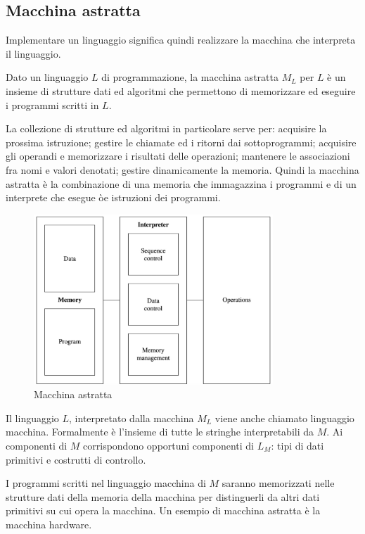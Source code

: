 \documentclass[oneside,a4paper,11pt]{book}
\theoremstyle{italicstyle}
\theoremstyle{normStyle}
\begin{document}
\subsection{Macchina astratta}
Implementare un linguaggio significa quindi realizzare la macchina 
che interpreta il linguaggio.
\begin{tcolorbox}
Dato un linguaggio $L$ di programmazione, la macchina astratta 
$M_L$ per $L$ è un insieme di strutture dati ed algoritmi che permettono 
di memorizzare ed eseguire i programmi scritti in $L$.
\end{tcolorbox}
La collezione di strutture ed algoritmi in particolare serve per: 
acquisire la prossima istruzione; gestire le chiamate ed i ritorni dai sottoprogrammi;
acquisire gli operandi e memorizzare i risultati delle operazioni; 
mantenere le associazioni fra nomi e valori denotati; gestire dinamicamente 
la memoria. Quindi la macchina astratta è la combinazione di una memoria che immagazzina 
i programmi e di un interprete che esegue òe istruzioni dei programmi.
\begin{figure}[H]
  \centering
  \includegraphics[width=9cm]{img/macchinaAstratta.png}
  \caption{Macchina astratta}
  \label{fig:macchina_astratta}
\end{figure}
Il linguaggio $L$, interpretato dalla macchina $M_L$ viene anche chiamato linguaggio macchina.
Formalmente è l'insieme di tutte le stringhe interpretabili da $M$. Ai componenti 
di $M$ corrispondono opportuni componenti di $L_M$: tipi di dati primitivi 
e costrutti di controllo.

I programmi scritti nel linguaggio macchina di $M$ saranno memorizzati 
nelle strutture dati della memoria della macchina per distinguerli da 
altri dati primitivi su cui opera la macchina. Un esempio di macchina astratta 
è la macchina hardware.
\end{document}
